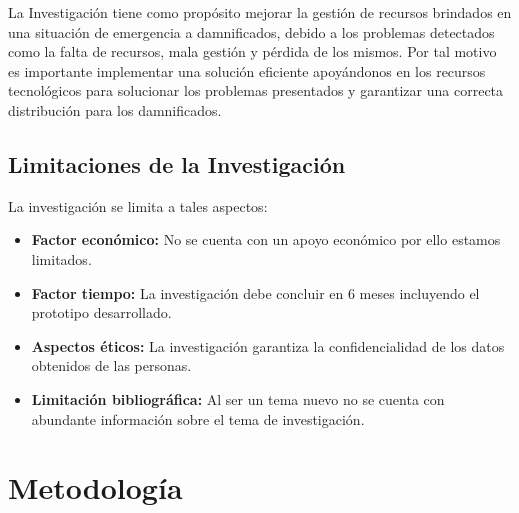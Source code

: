 \documentclass[11pt,openany]{book}
\begin{document}
	La Investigación tiene como propósito mejorar la gestión de recursos brindados en una situación de emergencia a damnificados, debido a los problemas detectados como la falta de recursos, mala gestión y pérdida de los mismos. Por tal motivo es importante implementar una solución eficiente apoyándonos en los recursos tecnológicos para solucionar los problemas presentados y garantizar una correcta distribución para los damnificados.\\

	\section{Limitaciones de la Investigación}

	La investigación se limita a tales aspectos:
	\begin{itemize}
		\item \textbf{Factor económico: }No se cuenta con un apoyo económico por ello estamos limitados.
		\item \textbf{Factor tiempo: }La investigación debe concluir en 6 meses incluyendo el prototipo desarrollado.
		\item \textbf{Aspectos éticos: }La investigación garantiza la confidencialidad de los datos obtenidos de las personas.
		\item \textbf{Limitación bibliográfica: }Al ser un tema nuevo no se cuenta con abundante información sobre el tema de investigación.
	\end{itemize}

	\chapter{Metodología}
	
	\newpage
\end{document}
